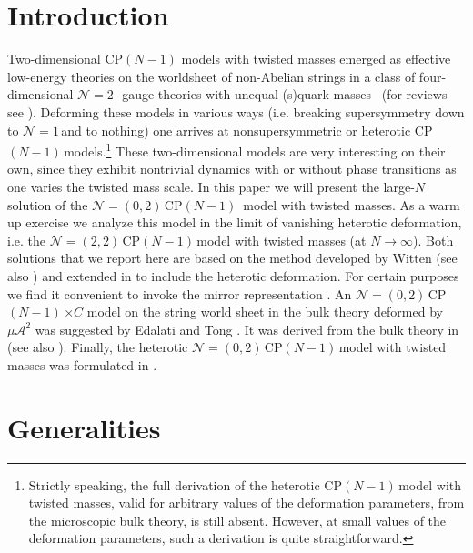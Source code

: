 \documentclass[epsfig,12pt]{article}
\newcommand{\ntwo}{${\mathcal N}=2\,$}
\newcommand{\none}{${\mathcal N}=1\,$}
\newcommand{\ntt}{${\mathcal N}=(2,2)\,$}
\newcommand{\nzt}{${\mathcal N}=(0,2)\,$}
\newcommand{\cpn}{CP$(N-1)\,$}
\newcommand{\ca}{{\mathcal A}}
\begin{document}
\newpage


\section{Introduction}
\setcounter{equation}{0}

Two-dimensional  CP$(N-1)$ models with twisted masses
emerged as effective low-energy theories on
the worldsheet of non-Abelian strings in a class of 
four-dimensional \ntwo\, gauge theories with unequal (s)quark 
masses~\cite{HT1,ABEKY,SYmon,HT2} (for reviews see  \cite{Trev}). 
Deforming these models in various ways (i.e. breaking supersymmetry down to \none and to nothing)
one arrives at nonsupersymmetric or heterotic \cpn models.\footnote{
Strictly speaking, the full derivation of the
heterotic \cpn model with twisted masses, valid for arbitrary values of
the deformation parameters,  from the microscopic bulk theory, is still absent.
However, at small values of the deformation parameters,
such a derivation is quite straightforward.} These two-dimensional models are very 
interesting on their own,
since they exhibit nontrivial dynamics with or without phase transitions 
as one varies the twisted mass scale.
In this paper we will present the large-$N$ solution of the \nzt \mbox{\cpn}  model with twisted
masses. As a warm up exercise we analyze this model in the limit of vanishing heterotic deformation,
i.e. the \ntt \cpn model with twisted masses (at $N\to\infty$). Both solutions 
that we report here are based on the method developed by Witten
\cite{W79,W93} (see also \cite{dadvl}) and extended in \cite{SYhet} to include the heterotic deformation.
For certain purposes we find it convenient to invoke the mirror
representation \cite{MR1,MR2}. An \nzt \cpn$\times C$
model on the string world sheet in the bulk theory deformed by $\mu\ca^2$
was suggested by Edalati and Tong \cite{EdTo}.
It was derived from the bulk theory in \cite{SY1} (see also \cite{BSY1,BSY2}).
Finally, the heterotic \nzt  \cpn model with twisted masses was formulated in \cite{BSY3}.

\section{Generalities}
\setcounter{equation}{0}
\end{document}
